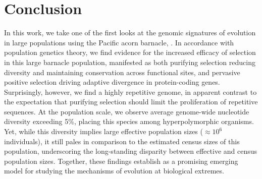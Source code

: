 \section*{Conclusion}

In this work, we take one of the first looks at the genomic signatures of evolution
in large populations using the Pacific acorn barnacle, \balgla{}.
In accordance with population genetics theory, we find evidence for the increased
efficacy of selection in this large barnacle population, manifested as both purifying
selection reducing diversity and maintaining conservation across functional sites, and
pervasive positive selection driving adaptive divergence in protein-coding genes.
Surprisingly, however, we find a highly repetitive genome, in apparent contrast to
the expectation that purifying selection should limit the proliferation of repetitive
sequences.
At the population scale, we observe average genome-wide
nucleotide diversity exceeding 5\%, placing this species among hyperpolymorphic
organisms.
Yet, while this diversity implies large effective population sizes ($\approx10^{6}$
individuals), it still pales in comparison to the estimated census sizes
of this population, underscoring the long-standing disparity between effective
and census population sizes.
Together, these findings establish \bgla{} as a promising emerging model for studying
the mechanisms of evolution at biological extremes.

